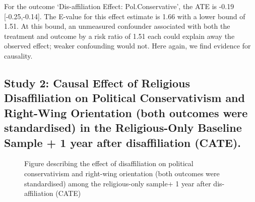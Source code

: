 \documentclass[
  singlecolumn]{article}
\begin{document}
For the outcome `Dis-affiliation Effect: Pol.Conservative', the ATE is
-0.19 {[}-0.25,-0.14{]}. The E-value for this effect estimate is 1.66
with a lower bound of 1.51. At this bound, an unmeasured confounder
associated with both the treatment and outcome by a risk ratio of 1.51
each could explain away the observed effect; weaker confounding would
not. Here again, we find evidence for causality.

\newpage{}

\subsection{Study 2: Causal Effect of Religious Disaffiliation on
Political Conservativism and Right-Wing Orientation (both outcomes were
standardised) in the Religious-Only Baseline Sample + 1 year after
disaffiliation
(CATE).}\label{study-2-causal-effect-of-religious-disaffiliation-on-political-conservativism-and-right-wing-orientation-both-outcomes-were-standardised-in-the-religious-only-baseline-sample-1-year-after-disaffiliation-cate.}

\begin{figure}


\caption{\label{fig-att}Figure describing the effect of disaffiliation
on political conservativism and right-wing orientation (both outcomes
were standardised) among the religious-only sample+ 1 year after
dis-affiliation (CATE)}

\end{figure}%
\end{document}
